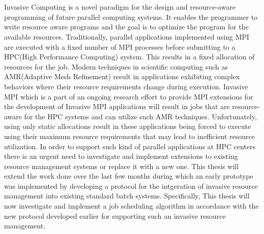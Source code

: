 \chapter{\abstractname}
Invasive Computing is a novel paradigm for the design and resource-aware programming of future parallel computing systems. It enables the programmer to write resource aware programs and the goal is to optimize the program for the available resources. Traditionally, parallel applications implemented using MPI are executed with a fixed number of MPI processes before submitting to a HPC(High Performance Computing) system. This results in a fixed allocation of resources for the job. Modern techniques in scientific computing such as AMR(Adaptive Mesh Refinement) result in applications exhibiting complex behaviors where their resource requirements change during execution. Invasive MPI which is a part of an ongoing research effort to provide MPI extensions for the development of Invasive MPI applications will result in jobs that are resource-aware for the HPC systems and can utilize such AMR techniques. Unfortunately, using only static allocations result in these applications being forced to execute using their maximum resource requirements that may lead to inefficient resource utilization. In order to support such kind of parallel applications at HPC centers there is an urgent need to investigate and implement extensions to existing resource management systems or replace it with a new one. This thesis will extend the work done over the last few months during which an early prototype was implemented by developing a protocol for the intgeration of invasive resource management into existing standard batch systems. Specifically, This thesis will now investigate and implement a job scheduling algorithm in accordance with the new protocol developed earlier for supporting such an invasive resource management.\par



